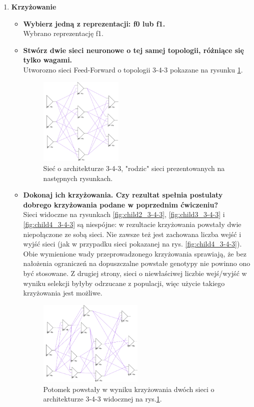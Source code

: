 \begin{enumerate}
\begin{itemize}
	\end{itemize}
\item \textbf{Krzyżowanie}
	\begin{itemize}
		\item \textbf{Wybierz jedną z reprezentacji: f0 lub f1.}
		\\Wybrano reprezentację f1.
		\item \textbf{Stwórz dwie sieci neuronowe o tej samej topologii, różniące się tylko wagami.}
		\\Utworozno sieci Feed-Forward o topologii 3-4-3 pokazane na rysunku \ref{fig:3-4-3}.
		\begin{figure}[h]
		\centering
		\includegraphics[width=0.4\textwidth]{dane/part2/zad3/3-4-3}
		\caption{Sieć o architekturze 3-4-3, "rodzic" sieci prezentowanych na następnych rysunkach.\label{fig:3-4-3}}
		\end{figure}
		
		\item \textbf{Dokonaj ich krzyżowania. Czy rezultat spełnia postulaty dobrego krzyżowania podane w poprzednim ćwiczeniu? }
		\\Sieci widoczne na rysunkach \ref{fig:child2_3-4-3}, \ref{fig:child3_3-4-3} i \ref{fig:child4_3-4-3} są niespójne: w rezultacie krzyżowania powstały dwie niepołączone ze sobą sieci. Nie zawsze też jest zachowana liczba wejść i wyjść sieci (jak w przypadku sieci pokazanej na rys. \ref{fig:child4_3-4-3}). Obie wymienione wady przeprowadzonego krzyżowania sprawiają, że bez nałożenia ograniczeń na dopuszczalne powstałe genotypy nie powinno ono być stosowane. Z drugiej strony, sieci o niewłaściwej liczbie wejś/wyjść w wyniku selekcji byłyby odrzucane z populacji, więc użycie takiego krzyżowania jest możliwe.
		
		
		\begin{figure}[h]
		\centering
		\includegraphics[width=0.5\textwidth]{dane/part2/zad3/dziecko1_3-4-3}
		\caption{Potomek powstały w wyniku krzyżowania dwóch sieci o architekturze 3-4-3 widocznej na rys.\ref{fig:3-4-3}.\label{fig:child1_3-4-3}}
		\end{figure}
				

\end{itemize}
\end{enumerate}
